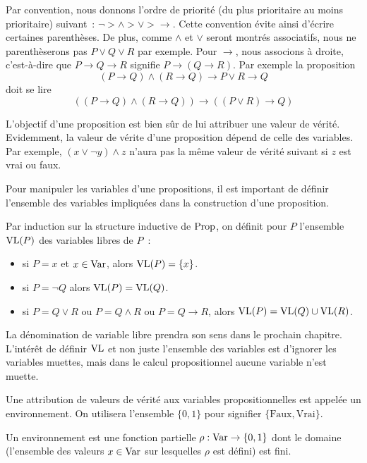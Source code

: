 Par convention, nous donnons l'ordre de priorité (du plus prioritaire au moins
prioritaire) suivant~: $\lnot > \land > \lor > \to$. Cette convention évite
ainsi d'écrire certaines parenthèses. De plus, comme $\land$ et $\lor$ seront
montrés associatifs, nous ne parenthèserons pas $P\lor Q\lor R$ par exemple.
Pour $\to$, nous associons à droite, c'est-à-dire que $P\to Q\to R$ signifie
$P\to (Q \to R)$. Par exemple la proposition
\[(P \to Q)\land (R \to Q) \to P\lor R \to Q\] doit se lire
\[((P \to Q) \land (R \to Q)) \to ((P \lor R) \to Q)\]

L'objectif d'une proposition est bien sûr de lui attribuer une valeur de vérité.
Evidemment, la valeur de vérite d'une proposition dépend de celle des variables.
Par exemple, $(x\lor \lnot y) \land z$ n'aura pas la même valeur de vérité
suivant si $z$ est vrai ou faux.

Pour manipuler les variables d'une propositions, il est important de définir
l'ensemble des variables impliquées dans la construction d'une proposition.

\begin{definition}
  Par induction sur la structure inductive de $\operatorname{Prop}$, on définit pour
  $P$ l'ensemble $\operatorname{VL}(P)$ des variables libres de $P$~:
  \begin{itemize}
  \item si $P = x$ et $x\in\operatorname{Var}$, alors $\operatorname{VL}(P) = \{x\}$.
  \item si $P = \lnot Q$ alors $\operatorname{VL}(P) = \operatorname{VL}(Q)$.
  \item si $P = Q \lor R$ ou $P = Q \land R$ ou $P = Q \to R$,
    alors $\operatorname{VL}(P) = \operatorname{VL}(Q)\cup\operatorname{VL}(R)$.
  \end{itemize}
\end{definition}

\begin{remark}
  La dénomination de variable \og libre\fg{} prendra son sens dans le prochain
  chapitre. L'intérêt de définir $\operatorname{VL}$ et non juste l'ensemble des variables est
  d'ignorer les variables muettes, mais dans le calcul propositionnel aucune
  variable n'est muette.
\end{remark}

Une attribution de valeurs de vérité aux variables propositionnelles est appelée
un environnement. On utilisera l'ensemble $\{0,1\}$ pour signifier
$\{\mathrm{Faux},\mathrm{Vrai}\}$.

\begin{definition}[Environnement]
  Un environnement est une fonction partielle $\rho : \operatorname{Var} \to \{0,1\}$
  dont le domaine (l'ensemble des valeurs $x\in \operatorname{Var}$ sur lesquelles
  $\rho$ est défini) est fini.
\end{definition}

